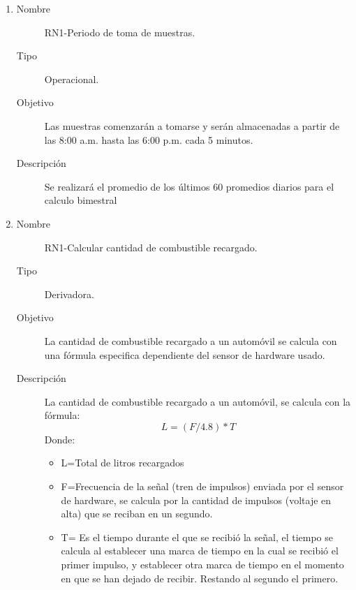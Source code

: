 \begin{enumerate}[label=RN\arabic*.]
\item \label{RN5}
		\begin{description}
			\item[Nombre] RN1-Periodo de toma de muestras.
			\item[Tipo] Operacional.
			\item[Objetivo] Las muestras comenzarán a tomarse y serán almacenadas a partir de las 8:00 a.m. hasta las 6:00 p.m. cada 5 minutos.
			\item[Descripción] Se realizará el promedio de los últimos 60 promedios diarios para el calculo bimestral
		\end{description}













	\item \label{RN1}
		\begin{description}
			\item[Nombre] RN1-Calcular cantidad de combustible recargado.
			\item[Tipo] Derivadora.
			\item[Objetivo] La cantidad de combustible recargado a un automóvil se calcula con una fórmula especifica dependiente del sensor de hardware usado.
			\item[Descripción] La cantidad de combustible recargado a un automóvil, se calcula con la fórmula: $$L=(F/4.8)*T$$
			Donde:
				\begin{itemize}
					\item L=Total de litros recargados
					\item F=Frecuencia de la señal (tren de impulsos) enviada por el sensor de hardware, se calcula por la cantidad de impulsos (voltaje en alta) que se reciban en un segundo.
					\item T= Es el tiempo durante el que se recibió la señal, el tiempo se calcula al establecer una marca de tiempo en la cual se recibió el primer impulso, y establecer otra marca de tiempo en el momento en que se han dejado de recibir. Restando al segundo el primero.\cite{FS400A-G1}
				\end{itemize}
		\end{description}


\end{enumerate}
